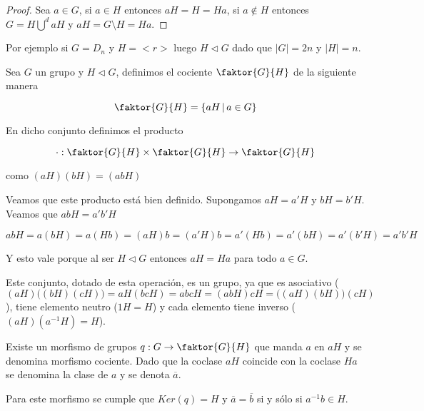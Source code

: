 \begin{proof}
Sea $a \in G$, si $a \in H$ entonces $aH = H = Ha$, si $a \notin H$ entonces $G = H \displaystyle \bigcup^d aH$ y $aH = G \setminus H = Ha$.
\end{proof}

Por ejemplo si $G = D_n$ y $H = <r>$ luego $H \triangleleft G$ dado que $|G| = 2n$ y $|H| = n$.

\begin{defn}
Sea $G$ un grupo y $H \triangleleft G$, definimos el cociente $\faktor{G}{H}$ de la siguiente manera

$$\faktor{G}{H} = \{aH \,|\, a \in G \}$$

En dicho conjunto definimos el producto

$$\cdot : \faktor{G}{H} \times \faktor{G}{H} \rightarrow \faktor{G}{H}$$

como $(aH)(bH) = (abH)$

Veamos que este producto est\'a bien definido. Supongamos $aH = a'H$ y $bH = b'H$. Veamos que $abH = a'b'H$

$$abH = a(bH) = a(Hb) = (aH)b = (a'H)b = a'(Hb) = a'(bH) = a'(b'H) = a'b'H$$

Y esto vale porque al ser $H \triangleleft G$ entonces $aH = Ha$ para todo $a \in G$.

\medskip
Este conjunto, dotado de esta operaci\'on, es un grupo, ya que es asociativo ($(aH)\big((bH)(cH)\big) = aH(bcH) = abcH = (abH)cH = \big((aH)(bH)\big)(cH)$), tiene elemento neutro ($1H = H$) y cada elemento tiene inverso ($(aH)(a^{-1}H) = H$).
\end{defn}

\begin{obs}
Existe un morfismo de grupos $q : G \rightarrow \faktor{G}{H}$ que manda $a$ en $aH$ y se denomina morfismo cociente. Dado que la coclase $aH$ coincide con la coclase $Ha$ se denomina la clase de $a$ y se denota $\overline{a}$.

Para este morfismo se cumple que $Ker(q) = H$ y $\overline{a} = \overline{b}$ si y s\'olo si $a^{-1}b \in H$.
\end{obs}